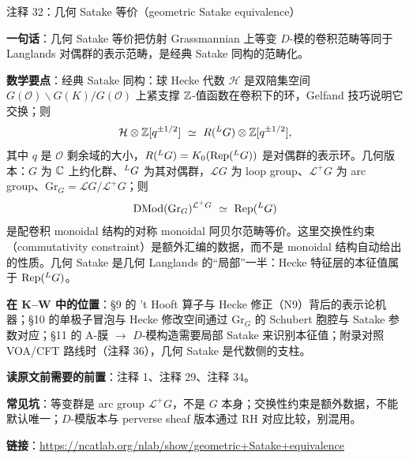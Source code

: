 \begin{kcard}{注释 32：几何 Satake 等价（geometric Satake equivalence）}

\textbf{一句话}：几何 Satake 等价把仿射 Grassmannian 上等变 $D$-模的卷积范畴等同于 Langlands 对偶群的表示范畴，是经典 Satake 同构的范畴化。

\textbf{数学要点}：经典 Satake 同构：球 Hecke 代数 $\mathcal H$ 是双陪集空间 $G(\mathcal O)\backslash G(K)/G(\mathcal O)$ 上紧支撑 $\mathbb{Z}$-值函数在卷积下的环，Gelfand 技巧说明它交换；则
\[
\mathcal H\otimes\mathbb{Z}[q^{\pm 1/2}]\ \simeq\ R({}^{L}G)\otimes\mathbb{Z}[q^{\pm 1/2}],
\]
其中 $q$ 是 $\mathcal O$ 剩余域的大小，$R({}^{L}G)=K_0(\mathrm{Rep}({}^{L}G))$ 是对偶群的表示环。几何版本：$G$ 为 $\mathbb{C}$ 上约化群、${}^{L}G$ 为其对偶群，$\mathcal L G$ 为 loop group、$\mathcal L^+G$ 为 arc group、$\mathrm{Gr}_G=\mathcal L G/\mathcal L^+G$；则
\[
\mathrm{DMod}(\mathrm{Gr}_G)^{\mathcal L^+G}\ \simeq\ \mathrm{Rep}({}^{L}G)
\]
是配卷积 monoidal 结构的对称 monoidal 阿贝尔范畴等价。这里交换性约束（commutativity constraint）是额外汇编的数据，而不是 monoidal 结构自动给出的性质。几何 Satake 是几何 Langlands 的“局部”一半：Hecke 特征层的本征值属于 $\mathrm{Rep}({}^{L}G)$。

\textbf{在 K--W 中的位置}：§9 的 't Hooft 算子与 Hecke 修正（N9）背后的表示论机器；§10 的单极子冒泡与 Hecke 修改空间通过 $\mathrm{Gr}_G$ 的 Schubert 胞腔与 Satake 参数对应；§11 的 A-膜 $\to$ $D$-模构造需要局部 Satake 来识别本征值；附录对照 VOA/CFT 路线时（注释 36），几何 Satake 是代数侧的支柱。

\textbf{读原文前需要的前置}：注释 1、注释 29、注释 34。

\textbf{常见坑}：等变群是 arc group $\mathcal L^+G$，不是 $G$ 本身；交换性约束是额外数据，不能默认唯一；$D$-模版本与 perverse sheaf 版本通过 RH 对应比较，别混用。

\noindent\textbf{链接}：\url{https://ncatlab.org/nlab/show/geometric+Satake+equivalence}
\end{kcard}

